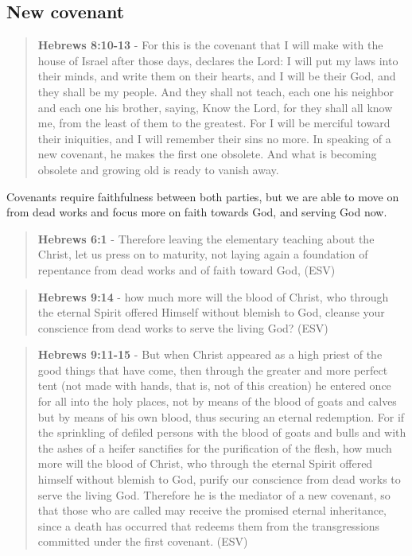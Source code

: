 \documentclass[11pt]{article}
\begin{document}
\subsection{New covenant}
\label{sec:org63be98f}
\begin{quote}
\textbf{Hebrews 8:10-13} - For this is the covenant that I will make with the house of Israel after those days, declares the Lord: I will put my laws into their minds, and write them on their hearts, and I will be their God, and they shall be my people. And they shall not teach, each one his neighbor and each one his brother, saying, Know the Lord, for they shall all know me, from the least of them to the greatest. For I will be merciful toward their iniquities, and I will remember their sins no more. In speaking of a new covenant, he makes the first one obsolete. And what is becoming obsolete and growing old is ready to vanish away.
\end{quote}

Covenants require faithfulness between both parties, but we are able to move on from dead works and focus more on faith towards God, and serving God now.

\begin{quote}
\textbf{Hebrews 6:1} - Therefore leaving the elementary teaching about the Christ, let us press on to maturity, not laying again a foundation of repentance from dead works and of faith toward God, (ESV)
\end{quote}

\begin{quote}
\textbf{Hebrews 9:14} - how much more will the blood of Christ, who through the eternal Spirit offered Himself without blemish to God, cleanse your conscience from dead works to serve the living God? (ESV)
\end{quote}

\begin{quote}
\textbf{Hebrews 9:11-15} - But when Christ appeared as a high priest of the good things that have come, then through the greater and more perfect tent (not made with hands, that is, not of this creation) he entered once for all into the holy places, not by means of the blood of goats and calves but by means of his own blood, thus securing an eternal redemption. For if the sprinkling of defiled persons with the blood of goats and bulls and with the ashes of a heifer sanctifies for the purification of the flesh, how much more will the blood of Christ, who through the eternal Spirit offered himself without blemish to God, purify our conscience from dead works to serve the living God. Therefore he is the mediator of a new covenant, so that those who are called may receive the promised eternal inheritance, since a death has occurred that redeems them from the transgressions committed under the first covenant. (ESV)
\end{quote}
\end{document}
